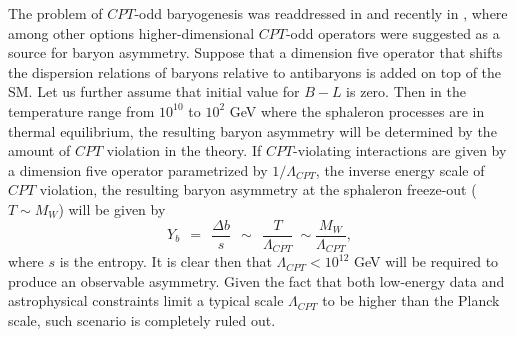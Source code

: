 \documentclass[12pt]{revtex4}
\begin{document}
    

    
	
	
	
	
	The problem of $CPT$-odd baryogenesis was readdressed in \cite{Bertolami:1996cq}
and recently in \cite{Carroll:2005dj}, where among other options 
higher-dimensional $CPT$-odd operators 
were suggested as a source for baryon asymmetry. Suppose that a dimension five operator that 
shifts the dispersion relations of baryons relative to antibaryons is added on top of the SM. 
Let us further assume that initial value for $B-L$ is zero.
Then in the temperature range from $10^{10}$ to $10^2$ GeV where the sphaleron processes are in thermal 
equilibrium, the resulting baryon asymmetry will be determined by the amount of $CPT$ violation in the 
theory. If $CPT$-violating interactions are given by a dimension five operator parametrized by $1/\Lambda_{CPT}$, 
the inverse energy scale of $CPT$ violation, the resulting baryon 
asymmetry at the sphaleron freeze-out ($T\sim M_W$) will be given by 
\begin{equation}
\label{baryo}
	Y_b ~~=~~ \frac{\Delta b}{s} ~~\sim~~ \frac{T}{\Lambda_{CPT}}~ \sim \frac{M_W}{\Lambda_{CPT}},
\end{equation}
	where $ s $ is the entropy. It is clear then that $\Lambda_{CPT}< 10^{12}$ GeV will 
	be required to produce an observable asymmetry. 
Given the fact that both low-energy data and 
	astrophysical constraints limit a typical scale $\Lambda_{CPT}$ to be higher than the Planck scale,
	such scenario is completely ruled out. 


\end{document}
